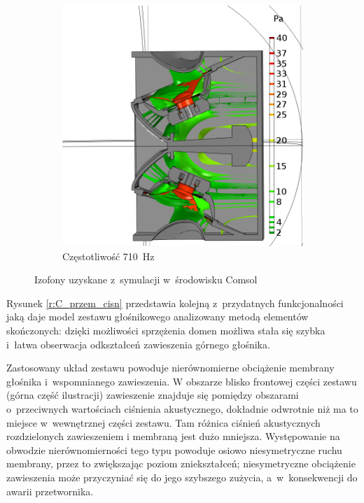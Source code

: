 \documentclass[12pt]{oska}
\begin{document}
\begin{figure}[!ht]
\begin{subfigure}[b]{.49\textwidth}
				\includegraphics[width=\textwidth]{absp_710Hz.png}
				\caption{Częstotliwość \SI{710}{\hertz}}
				\label{r:C_710iz}
			\end{subfigure}
			
			\caption{Izofony uzyskane z~symulacji w~środowisku Comsol}
			\label{r:C_balony}
		\end{figure}
		
		Rysunek \ref{r:C_przem_cisn} przedstawia kolejną z~przydatnych funkcjonalności jaką daje model zestawu głośnikowego analizowany metodą elementów skończonych: dzięki możliwości sprzężenia domen możliwa stała się szybka i~łatwa obserwacja odkształceń zawieszenia górnego głośnika. 
		
		Zastosowany układ zestawu powoduje nierównomierne obciążenie membrany głośnika i~wspomnianego zawieszenia. W obszarze blisko frontowej części zestawu (górna część ilustracji) zawieszenie znajduje się pomiędzy obszarami o~przeciwnych wartościach ciśnienia akustycznego, dokładnie odwrotnie niż ma to miejsce w~wewnętrznej części zestawu. Tam różnica ciśnień akustycznych rozdzielonych zawieszeniem i membraną jest dużo mniejsza. Występowanie na obwodzie nierównomierności tego typu powoduje osiowo niesymetryczne ruchu membrany, przez to zwiększając poziom zniekształceń; niesymetryczne obciążenie zawieszenia może przyczyniać się do jego szybszego zużycia, a~w~konsekwencji do awarii przetwornika.  
		
\end{document}
